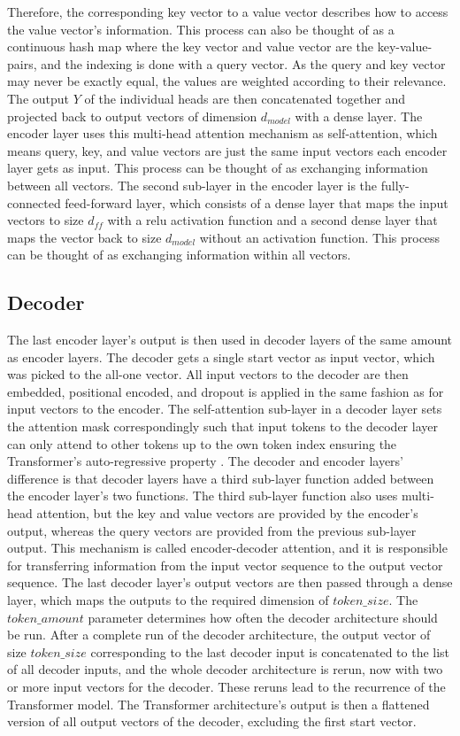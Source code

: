 \documentclass[draft,final]{vutinfth} %
\begin{document}
    Therefore, the corresponding key vector to a value vector describes how to access the value vector's information.
    This process can also be thought of as a continuous hash map where the key vector and value vector are the key-value-pairs, and the indexing is done with a query vector.
    As the query and key vector may never be exactly equal, the values are weighted according to their relevance.
    The output $Y$ of the individual heads are then concatenated together and projected back to output vectors of dimension $d_{model}$ with a dense layer. 
    The encoder layer uses this multi-head attention mechanism as self-attention, which means query, key, and value vectors are just the same input vectors each encoder layer gets as input.
    This process can be thought of as exchanging information between all vectors.
    The second sub-layer in the encoder layer is the fully-connected feed-forward layer, which consists of a dense layer that maps the input vectors to size $d_{ff}$ with a relu activation function and a second dense layer that maps the vector back to size $d_{model}$ without an activation function.
    This process can be thought of as exchanging information within all vectors.
        \subsection{Decoder} \label{decoder}
    The last encoder layer's output is then used in decoder layers of the same amount as encoder layers.
    The decoder gets a single start vector as input vector, which was picked to the all-one vector.
    All input vectors to the decoder are then embedded, positional encoded, and dropout is applied in the same fashion as for input vectors to the encoder.
    The self-attention sub-layer in a decoder layer sets the attention mask correspondingly such that input tokens to the decoder layer can only attend to other tokens up to the own token index ensuring the Transformer's auto-regressive property \cite[p. 5]{Transformer}.  
    The decoder and encoder layers' difference is that decoder layers have a third sub-layer function added between the encoder layer's two functions.
    The third sub-layer function also uses multi-head attention, but the key and value vectors are provided by the encoder's output, whereas the query vectors are provided from the previous sub-layer output.
    This mechanism is called encoder-decoder attention, and it is responsible for transferring information from the input vector sequence to the output vector sequence.
    The last decoder layer's output vectors are then passed through a dense layer, which maps the outputs to the required dimension of $token\_size$.
    The $token\_amount$ parameter determines how often the decoder architecture should be run.
    After a complete run of the decoder architecture, the output vector of size $token\_size$ corresponding to the last decoder input is concatenated to the list of all decoder inputs, and the whole decoder architecture is rerun, now with two or more input vectors for the decoder.
    These reruns lead to the recurrence of the Transformer model.
    The Transformer architecture’s output is then a flattened version of all output vectors of the decoder, excluding the first start vector.
\end{document}
